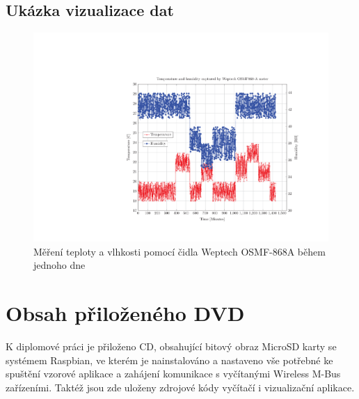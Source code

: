 \begin{landscape}
\chapter{Ukázka vizualizace dat}
\label{PrilohaGrafy}
	 \begin{figure}[!ht]
  \begin{center}
    \includegraphics[scale=0.8]{obrazky/chart_weptech}
  \end{center}
  \caption{Měření teploty a vlhkosti pomocí čidla Weptech OSMF-868A během jednoho dne}
	\label{GrafPriloha1}
\end{figure}
\end{landscape}

\chapter{Obsah přiloženého DVD}
\label{PrilohaMedium}
K diplomové práci je přiloženo CD, obsahující bitový obraz MicroSD karty se systémem Raspbian, ve kterém je nainstalováno a nastaveno vše potřebné ke spuštění vzorové aplikace a zahájení komunikace s vyčítanými Wireless M-Bus zařízeními. Taktéž jsou zde uloženy zdrojové kódy vyčítačí i vizualizační aplikace.


